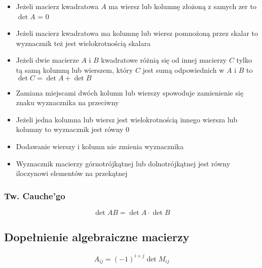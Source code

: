 \documentclass{../notatki}
\begin{document}
\begin{itemize}
    \item Jeżeli macierz kwadratowa $A$ ma wiersz lub kolumnę złożoną z samych zer to $\det A$ = 0
    \item Jeżeli macierz kwadratowa ma kolumnę lub wiersz pomnożoną przez skalar to wyznacznik też jest wielokrotnością skalara
    \item Jeżeli dwie macierze $A$ i $B$ kwadratowe różnią się od innej macierzy $C$ tylko tą samą kolumną lub wierszem, który $C$ jest sumą odpowiednich w $A$ i $B$ to $\det C = \det A + \det B$
    \item Zamiana miejscami dwóch kolumn lub wierszy spowoduje zamienienie się znaku wyznacznika na przeciwny
    \item Jeżeli jedna kolumna lub wiersz jest wielokrotnością innego wiersza lub kolumny to wyznacznik jest równy 0
    \item Dodawanie wierszy i kolumn nie zmienia wyznacznika
    \item Wyznacznik macierzy górnotrójkątnej lub dolnotrójkątnej jest równy iloczynowi elementów na przekątnej
\end{itemize}

\subsubsection{Tw. Cauche'go}

$$
\det AB = \det A \cdot \det B
$$

\subsection{Dopełnienie algebraiczne macierzy}

$$
A_{ij} = (-1)^{i + j} \det M_{ij} 
$$
\end{document}
